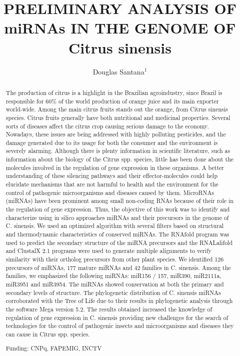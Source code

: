 \documentclass[twoside]{article}
\title{\vspace{-15mm}\fontsize{24pt}{10pt}\selectfont\textbf{PRELIMINARY ANALYSIS OF miRNAs IN THE GENOME OF Citrus sinensis}} %
\author{Douglas Santana$^1$}
\affil{1 UFU\\ }
\date{}
\begin{document}
\maketitle %

\thispagestyle{fancy} %


\begin{abstract}
The production of citrus is a highlight in the Brazilian agroindustry, since Brazil is responsible for 60\% of the world production of orange juice and its main exporter world-wide. Among the main citrus fruits stands out the orange, from Citrus sinensis species. Citrus fruits generally have both nutritional and medicinal properties. Several sorts of diseases affect the citrus crop causing serious damage to the economy. Nowadays, these issues are being addressed with highly polluting pesticides, and the damage generated due to its usage for both the consumer and the environment is severely alarming. Although there is plenty information in scientific literature, such as information about the biology of the Citrus spp. species, little has been done about the molecules involved in the regulation of gene expression in these organisms. A better understanding of these silencing pathways and their effector-molecules could help elucidate mechanisms that are not harmful to health and the environment for the control of pathogenic microorganisms and diseases caused by them. MicroRNAs (miRNAs) have been prominent among small non-coding RNAs because of their role in the regulation of gene expression. Thus, the objective of this work was to identify and characterize using in silico approaches miRNAs and their precursors in the genome of C. sinensis. We used an optimized algorithm with several filters based on structural and thermodynamic characteristics of conserved miRNAs. The RNAfold program was used to predict the secondary structure of the miRNA precursors and the RNALalifold and ClustalX 2.1 programs were used to generate multiple alignments to verify similarity with their ortholog precursors from other plant species. We identified 126 precursors of miRNAs, 177 mature miRNAs and 42 families in C. sinensis. Among the families, we emphasized the following miRNAs: miR156 / 157, miR390, miR2111a, miR3951 and miR3954. The miRNAs showed conservation at both the primary and secondary levels of structure. The phylogenetic distribution of C. sinensis miRNAs corroborated with the Tree of Life due to their results in phylogenetic analysis through the software Mega version 5.2. The results obtained increased the knowledge of regulation of gene expression in C. sinensis providing new challenges for the search of technologies for the control of pathogenic insects and microorganisms and diseases they can cause in Citrus spp. species.

Funding: CNPq, FAPEMIG, INCTV
\end{abstract}
\end{document}
